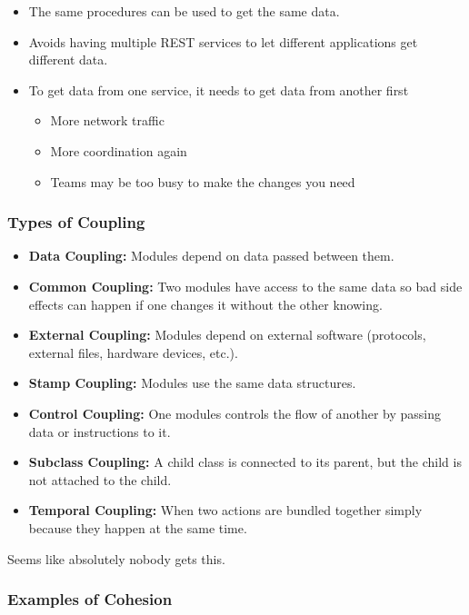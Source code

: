 \begin{itemize}
    \item The same procedures can be used to get the same data.
    \item Avoids having multiple REST services to let different applications get different data.
    \item To get data from one service, it needs to get data from another first
          \begin{itemize}
              \item More network traffic
              \item More coordination again
              \item Teams may be too busy to make the changes you need
          \end{itemize}
\end{itemize}

\subsubsection{Types of Coupling}\label{ssub:types_of_coupling}

\begin{itemize}
    \item \textbf{Data Coupling:} Modules depend on data passed between them.
    \item \textbf{Common Coupling:} Two modules have access to the same data so bad side effects can happen if one changes it without the other knowing.
    \item \textbf{External Coupling:} Modules depend on external software (protocols, external files, hardware devices, etc.).
    \item \textbf{Stamp Coupling:} Modules use the same data structures.
    \item \textbf{Control Coupling:} One modules controls the flow of another by passing data or instructions to it.
    \item \textbf{Subclass Coupling:} A child class is connected to its parent, but the child is not attached to the child.
    \item \textbf{Temporal Coupling:} When two actions are bundled together simply because they happen at the same time.
\end{itemize}

\begin{note}
    Seems like absolutely nobody gets this.
\end{note}

\subsubsection{Examples of Cohesion}\label{ssub:examples_of_cohesion}

